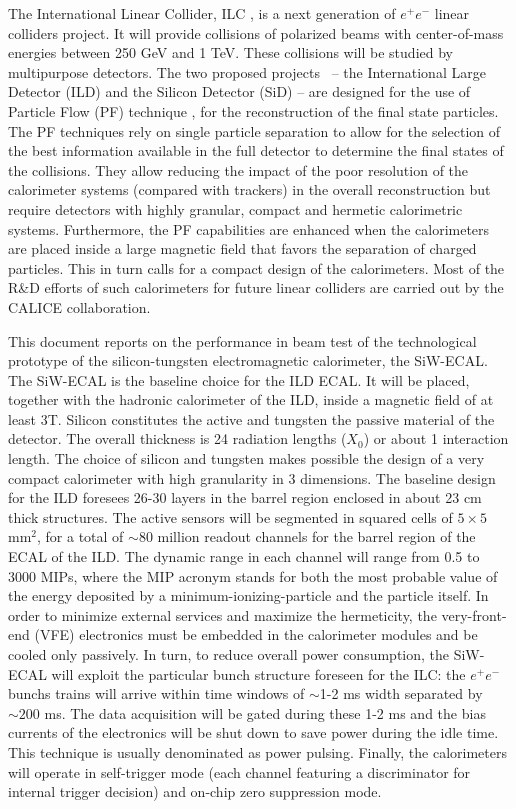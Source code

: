 \documentclass[final,3p,times,twocolumn]{elsarticle}
\begin{document}
The International Linear Collider, ILC \cite{Behnke:2013xla,Baer:2013cma,Adolphsen:2013jya,Adolphsen:2013kya,Behnke:2013lya},
is a next generation of $e^{+}e^{-}$
linear colliders project. It will
provide collisions of polarized beams with center-of-mass energies between 250 GeV and 1 TeV.
These collisions will be studied by multipurpose detectors.
The two proposed projects~\cite{Behnke:2013lya} --  the International
Large Detector (ILD) and the Silicon Detector
(SiD) -- are designed for the use of Particle Flow (PF) technique  \cite{Brient:2002gh,Morgunov:2004ed}, for the
reconstruction of the final state particles.
The PF techniques rely on single particle separation
to allow for the selection of the best information available
in the full detector to determine the final states of the collisions.
They allow reducing the impact of the poor resolution of the calorimeter systems
(compared with trackers) in the overall reconstruction
but require detectors with highly granular, compact
and hermetic calorimetric systems. Furthermore, the PF capabilities are enhanced when the calorimeters
are placed inside a large magnetic field that favors the separation of charged particles. 
This in turn calls for a compact design of the calorimeters.
Most of the R\&D efforts of such calorimeters 
for future linear colliders are carried out by the CALICE collaboration.

This document reports on the performance 
in beam test of the technological prototype of the silicon-tungsten electromagnetic calorimeter,
the SiW-ECAL.
The SiW-ECAL is the baseline choice for the ILD ECAL. It will be placed, together with the hadronic calorimeter
of the ILD, inside a magnetic field of at least 3T.
Silicon constitutes the active and tungsten the passive material of the detector. 
The overall thickness is 24 radiation
lengths ($X_{0}$) or about 1 interaction length.
The choice of silicon and tungsten makes possible the design
of a very compact calorimeter with high granularity in 3 dimensions. The baseline design
for the ILD foresees 26-30 layers in the barrel region enclosed in about 23 cm thick structures.
The active sensors will be segmented in squared cells of $5\times5$ mm$^2$,
for a total of $\sim$80 million readout channels for the barrel region of the ECAL of the ILD.
The dynamic range in each channel will range from 0.5 to 3000 MIPs, where the MIP acronym stands 
for both the most probable value of the energy deposited by a minimum-ionizing-particle and the particle itself.
In order to minimize external services and maximize the hermeticity, the very-front-end (VFE) electronics
must be embedded in the calorimeter modules and be cooled only passively.
In turn, to reduce overall power consumption, the SiW-ECAL will exploit the particular bunch structure
foreseen for the ILC: the $e^{+}e^{-}$ bunchs trains will arrive within
time windows of $\sim$1-2 ms width separated by $\sim200$ ms.
The data acquisition will be gated during these 1-2 ms and
the bias currents of the electronics will be shut down to save power during the idle time.
This technique is usually denominated as power pulsing. Finally,
the calorimeters will operate in self-trigger mode (each channel featuring a discriminator for internal trigger decision) and on-chip zero suppression mode. 
\end{document}

